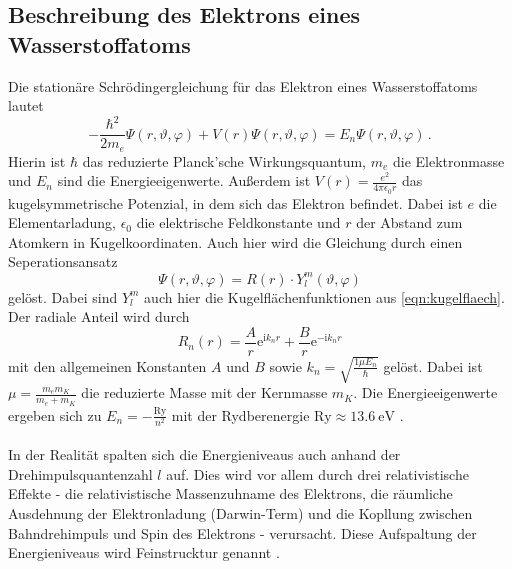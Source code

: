 \subsection{Beschreibung des Elektrons eines Wasserstoffatoms}\label{sec:wasserstoff}
Die stationäre Schrödingergleichung für das Elektron eines Wasserstoffatoms lautet
\begin{equation}
    - \frac{\hbar^2}{2 m_e} \Psi\left(r, \vartheta, \varphi \right) + V \left(r\right) \Psi\left(r, \vartheta, \varphi \right) = E_n \Psi\left(r, \vartheta, \varphi \right) \, .
    \label{eqn:schroedinger}
\end{equation}
Hierin ist $\hbar$ das reduzierte Planck'sche Wirkungsquantum, $m_e$ die Elektronmasse und $E_n$ sind die Energieeigenwerte. 
Außerdem ist $V\left(r\right) = \frac{e^2}{4 \pi \epsilon_0 r}$ das kugelsymmetrische Potenzial, in dem sich das Elektron befindet.
Dabei ist $e$ die Elementarladung, $\epsilon_0$ die elektrische Feldkonstante und $r$ der Abstand zum Atomkern in Kugelkoordinaten. 
Auch hier wird die Gleichung durch einen Seperationsansatz
\begin{equation*}
     \Psi\left(r, \vartheta, \varphi \right) = R\left(r\right) \cdot Y_l^m \left(\vartheta,\varphi\right)
\end{equation*}
gelöst.
Dabei sind $Y_l^m$ auch hier die Kugelflächenfunktionen aus \autoref{eqn:kugelflaech}.
Der radiale Anteil wird durch 
\begin{equation*}
    R_n \left(r\right)= \frac{A}{r}\mathrm{e}^{\mathrm{i} k_n r} + \frac{B}{r}\mathrm{e}^{-\mathrm{i} k_n r}
\end{equation*}
mit den allgemeinen Konstanten $A$ und $B$ sowie $k_n=\sqrt{\frac{1 \mu E_n}{\hbar}}$ gelöst.
Dabei ist $\mu = \frac{m_e m_K}{m_e + m_K}$ die reduzierte Masse mit der Kernmasse $m_K$.
Die Energieeigenwerte ergeben sich zu $E_n = -\frac{\mathrm{Ry}}{n^2}$ mit der Rydberenergie $\mathrm{Ry} \approx \qty{13.6}{\electronvolt}$ \cite[141-145]{demtröder_2016}.
\\\\
In der Realität spalten sich die Energieniveaus auch anhand der Drehimpulsquantenzahl $l$ auf.
Dies wird vor allem durch drei relativistische Effekte - die relativistische Massenzuhname des Elektrons, die räumliche Ausdehnung der Elektronladung (Darwin-Term) und 
die Kopllung zwischen Bahndrehimpuls und Spin des Elektrons - verursacht. 
Diese Aufspaltung der Energieniveaus wird Feinstrucktur genannt \cite[153-155]{demtröder_2016}.
%
%
%
%
